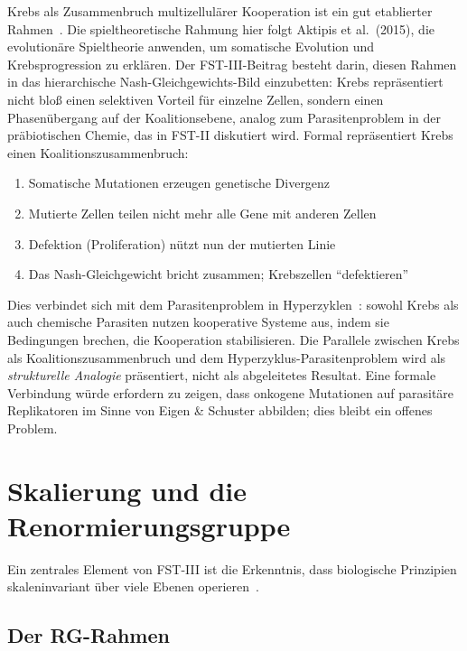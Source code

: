 \documentclass[12pt,a4paper]{article}
\theoremstyle{remark}
\begin{document}
Krebs als Zusammenbruch multizellulärer Kooperation ist ein gut etablierter Rahmen~\citep{AktipisCancer}. Die spieltheoretische Rahmung hier folgt Aktipis et al.\ (2015), die evolutionäre Spieltheorie anwenden, um somatische Evolution und Krebsprogression zu erklären. Der FST-III-Beitrag besteht darin, diesen Rahmen in das hierarchische Nash-Gleichgewichts-Bild einzubetten: Krebs repräsentiert nicht bloß einen selektiven Vorteil für einzelne Zellen, sondern einen Phasenübergang auf der Koalitionsebene, analog zum Parasitenproblem in der präbiotischen Chemie, das in FST-II diskutiert wird. Formal repräsentiert Krebs einen Koalitionszusammenbruch:
\begin{enumerate}
    \item Somatische Mutationen erzeugen genetische Divergenz
    \item Mutierte Zellen teilen nicht mehr alle Gene mit anderen Zellen
    \item Defektion (Proliferation) nützt nun der mutierten Linie
    \item Das Nash-Gleichgewicht bricht zusammen; Krebszellen ``defektieren''
\end{enumerate}

Dies verbindet sich mit dem Parasitenproblem in Hyperzyklen~\citep{FSTII}: sowohl Krebs als auch chemische Parasiten nutzen kooperative Systeme aus, indem sie Bedingungen brechen, die Kooperation stabilisieren. Die Parallele zwischen Krebs als Koalitionszusammenbruch und dem Hyperzyklus-Parasitenproblem wird als \emph{strukturelle Analogie} präsentiert, nicht als abgeleitetes Resultat. Eine formale Verbindung würde erfordern zu zeigen, dass onkogene Mutationen auf parasitäre Replikatoren im Sinne von Eigen \& Schuster abbilden; dies bleibt ein offenes Problem.

\section{Skalierung und die Renormierungsgruppe}
\label{sec:renormalization}

Ein zentrales Element von FST-III ist die Erkenntnis, dass biologische Prinzipien skaleninvariant über viele Ebenen operieren~\citep{ScaleRGFrontiers,ScaleRGResearch}.

\subsection{Der RG-Rahmen}
\end{document}
